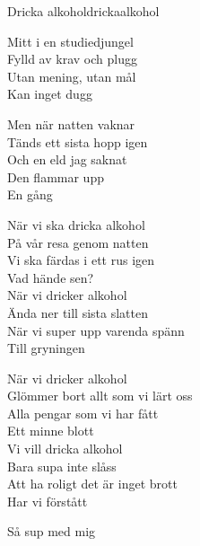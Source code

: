 \begin{song}{Dricka alkohol}{drickaalkohol}
\begin{vers}
Mitt i en studiedjungel\\
Fylld av krav och plugg\\
Utan mening, utan mål\\
Kan inget dugg\\
\end{vers}
\begin{vers}
Men när natten vaknar\\
Tänds ett sista hopp igen\\
Och en eld jag saknat\\
Den flammar upp\\
En gång\\
\end{vers}
\begin{vers}
När vi ska dricka alkohol\\
På vår resa genom natten\\
Vi ska färdas i ett rus igen\\
Vad hände sen?\\
När vi dricker alkohol\\
Ända ner till sista slatten\\
När vi super upp varenda spänn\\
Till gryningen\\
\end{vers}
\newp
\begin{vers}
När vi dricker alkohol\\
Glömmer bort allt som vi lärt oss\\
Alla pengar som vi har fått\\
Ett minne blott\\
Vi vill dricka alkohol\\
Bara supa inte slåss\\
Att ha roligt det är inget brott\\
Har vi förstått\\
\end{vers}
\begin{vers}
Så sup med mig\\
\end{vers}
\end{song}
